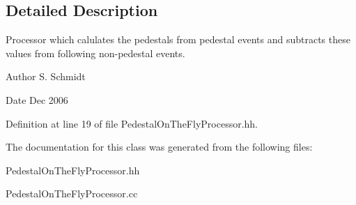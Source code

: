 \subsection{Detailed Description}
Processor which calulates the pedestals from pedestal events and subtracts these values from following non-\/pedestal events. \begin{DoxyAuthor}{Author}
S. Schmidt 
\end{DoxyAuthor}
\begin{DoxyDate}{Date}
Dec 2006 
\end{DoxyDate}


Definition at line 19 of file PedestalOnTheFlyProcessor.hh.

The documentation for this class was generated from the following files:\begin{DoxyCompactItemize}
\item 
PedestalOnTheFlyProcessor.hh\item 
PedestalOnTheFlyProcessor.cc\end{DoxyCompactItemize}
